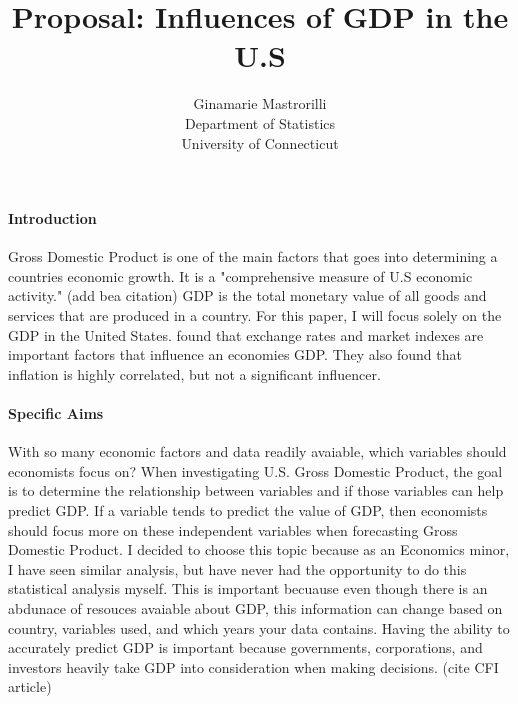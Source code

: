 \documentclass[12pt]{article}
\title{Proposal: Influences of GDP in the U.S }
\author{Ginamarie Mastrorilli\\
  Department of Statistics\\
  University of Connecticut
}
\begin{document}
\maketitle


\paragraph{Introduction}
Gross Domestic Product is one of the main factors that goes into determining a countries economic growth. 
It is a "comprehensive measure of U.S economic activity." (add bea citation) 
GDP is the total monetary value of all goods and services that are produced in a country. For this paper, I will focus solely on the GDP in the United States. 
\citet{divya2014study} found that exchange rates and market indexes are important factors that influence an economies GDP. They also found that inflation is highly correlated, but not a significant influencer.  

\paragraph{Specific Aims}
With so many economic factors and data readily avaiable, which variables should economists focus on?
When investigating U.S. Gross Domestic Product, the goal is to determine the relationship between variables and if those variables can help predict GDP.
If a variable tends to predict the value of GDP, then economists should focus more on these independent variables when forecasting Gross Domestic Product.
I decided to choose this topic because as an Economics minor, I have seen similar analysis, but have never had the opportunity to do this statistical analysis myself. 
This is important becuause even though there is an abdunace of resouces avaiable about GDP, this information can change based on country, variables used, and which years your data contains. 
Having the ability to accurately predict GDP is important because governments, corporations, and investors heavily take GDP into consideration when making decisions. (cite CFI article)
\end{document}
